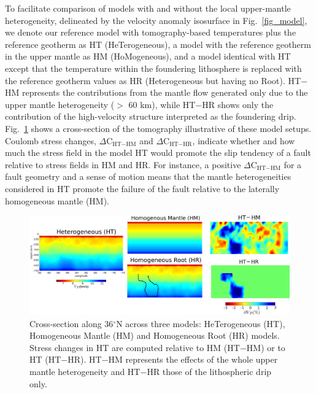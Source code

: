 \documentclass[draft,linenumbers]{agujournal2018}
\begin{document}
To facilitate comparison of models with and without the local upper-mantle heterogeneity, delineated by the velocity anomaly isosurface in Fig.~\ref{fig_model}, we denote our reference model with tomography-based temperatures plus the reference geotherm as HT (HeTerogeneous), a model with the reference geotherm in the upper mantle as HM (HoMogeneous), and a model identical with HT except that the temperature within the foundering lithosphere is replaced with the reference geotherm values as HR (Heterogeneous but having no Root). HT$-$HM represents the contributions from the mantle flow generated only due to the upper mantle heterogeneity ($>$ 60 km), while HT$-$HR shows only the contribution of the high-velocity structure interpreted as the foundering drip. Fig.~\ref{model_differences} shows a cross-section of the tomography illustrative of these model setups.  Coulomb stress changes, $\Delta$C$_{\text{HT}-\text{HM}}$ and $\Delta$C$_{\text{HT}-\text{HR}}$, indicate whether and how much the stress field in the model HT would promote the slip tendency of a fault relative to stress fields in HM and HR. For instance, a positive $\Delta$C$_{\text{HT}-\text{HM}}$ for a fault geometry and a sense of motion means that the mantle heterogeneities considered in HT promote the failure of the fault relative to the laterally homogeneous mantle (HM). 

\begin{figure}[h!]
    \centering
    \includegraphics[width=\linewidth]{figures/model_differences_updated.png}
    \caption{Cross-section along 36$^\circ$N across three models: HeTerogeneous (HT), Homogeneous Mantle (HM) and Homogeneous Root (HR) models. Stress changes in HT are computed relative to HM (HT$-$HM) or to HT (HT$-$HR).  HT$-$HM represents the effects of the whole upper mantle heterogeneity and HT$-$HR those of the lithospheric drip only.}
    \label{model_differences}
\end{figure}
\end{document}
